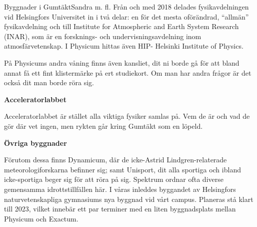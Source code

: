 \documentclass{spektraklet}
\begin{document}
\begin{artikel}{Byggnader i Gumtäkt}{Sandra m. fl.}
Från och med 2018 delades fysikavdelningen vid Helsingfors Universitet in i två delar: en för det mesta oförändrad, “allmän” fysikavdelning och till Institute for Atmospheric and Earth System Research (INAR), som är en forsknings- och undervisningsavdelning inom atmosfärvetenskap. I Physicum hittas även HIP- Helsinki Institute of Physics.

På Physicums andra våning finns även kansliet, dit ni borde gå för att bland annat få ett fint klistermärke på ert studiekort. Om man har andra frågor är det också dit man borde röra sig. 


\textbf{Acceleratorlabbet}

Acceleratorlabbet är stället alla viktiga fysiker samlas på. Vem de är och vad de gör där vet ingen, men rykten går kring Gumtäkt som en löpeld.
\vspace{2cm}

\textbf{Övriga byggnader}

Förutom dessa finns Dynamicum, där de icke-Astrid Lindgren-relaterade meteorologiforskarna befinner sig; samt Unisport, dit alla sportiga och ibland icke-sportiga beger sig för att röra på sig. Spektrum ordnar ofta diverse gemensamma idrottstillfällen här. I våras inleddes byggandet av Helsingfors naturvetenskapliga gymnasiums nya byggnad vid vårt campus. Planeras stå klart till 2023, vilket innebär ett par terminer med en liten byggnadsplats mellan Physicum och Exactum. 




\end{artikel}
\end{document}
